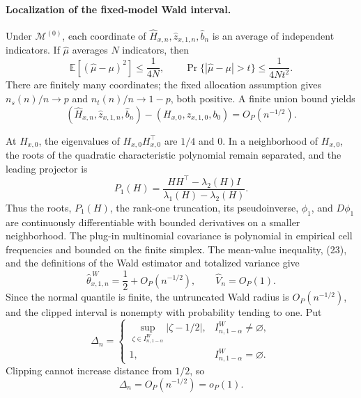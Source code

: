 \paragraph{Localization of the fixed-model Wald interval.}
Under \(\mathcal M^{(0)}\), each coordinate of \(\widehat H_{x,n},\widehat z_{x,1,n},\widehat b_n\) is an average of independent indicators.  If \(\widehat\mu\) averages \(N\) indicators, then
\[
\mathbb E[(\widehat\mu-\mu)^2]\le\frac1{4N},
\qquad
\Pr\{|\widehat\mu-\mu|>t\}\le\frac1{4Nt^2}.
\tag{22}
\]
There are finitely many coordinates; the fixed allocation assumption gives \(n_s(n)/n\to p\) and \(n_t(n)/n\to1-p\), both positive.  A finite union bound yields
\[
(\widehat H_{x,n},\widehat z_{x,1,n},\widehat b_n)
-(H_{x,0},z_{x,1,0},b_0)=O_P(n^{-1/2}).
\tag{23}
\]

At \(H_{x,0}\), the eigenvalues of \(H_{x,0}H_{x,0}^{\top}\) are \(1/4\) and \(0\).  In a neighborhood of \(H_{x,0}\), the roots of the quadratic characteristic polynomial remain separated, and the leading projector is
\[
P_1(H)=\frac{HH^{\top}-\lambda_2(H)I}{\lambda_1(H)-\lambda_2(H)}.
\tag{24}
\]
Thus the roots, \(P_1(H)\), the rank-one truncation, its pseudoinverse, \(\phi_1\), and \(D\phi_1\) are continuously differentiable with bounded derivatives on a smaller neighborhood.  The plug-in multinomial covariance is polynomial in empirical cell frequencies and bounded on the finite simplex.  The mean-value inequality, (23), and the definitions of the Wald estimator and totalized variance give
\[
\widehat\theta^{\,W}_{x,1,n}=\frac12+O_P(n^{-1/2}),
\qquad
\widehat V_n=O_P(1).
\tag{25}
\]
Since the normal quantile is finite, the untruncated Wald radius is \(O_P(n^{-1/2})\), and the clipped interval is nonempty with probability tending to one.  Put
\[
\Delta_n=
\begin{cases}
\sup_{\zeta\in I^W_{n,1-\alpha}}|\zeta-1/2|,
&I^W_{n,1-\alpha}\ne\varnothing,\\
1,&I^W_{n,1-\alpha}=\varnothing.
\end{cases}
\]
Clipping cannot increase distance from \(1/2\), so
\[
\Delta_n=O_P(n^{-1/2})=o_P(1).
\tag{26}
\]

